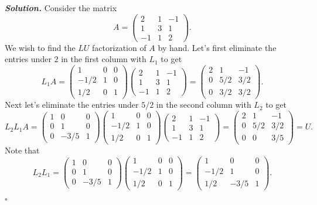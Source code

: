 \documentclass[12pt]{report}
\newenvironment{solution}[1][\it{Solution}]{\textbf{#1. } }{$\square$}
\begin{document}
\begin{solution}
    \noindent
    Consider the matrix
    \[
    A = \begin{pmatrix} 2 & 1 & -1 \\ 1 & 3 & 1 \\ -1 & 1 & 2 \end{pmatrix}.
    \]
    We wish to find the $LU$ factorization of $A$ by hand. Let's first eliminate the entries under $2$ in the first column with $L_1$ to get
    \[L_1A =  \begin{pmatrix}1&0&0\\-1/2&1&0\\1/2&0&1\end{pmatrix}\begin{pmatrix} 2 & 1 & -1 \\ 1 & 3 & 1 \\ -1 & 1 & 2 \end{pmatrix} = \begin{pmatrix}2&1&-1\\ 0&5/2&3/2\\ 0&3/2&3/2\end{pmatrix}.\]
    Next let's eliminate the entries under $5/2$ in the second column with $L_2$ to get
    \[L_2L_1A = \begin{pmatrix}1&0&0\\0&1&0\\0&-3/5&1\end{pmatrix}\begin{pmatrix}1&0&0\\-1/2&1&0\\1/2&0&1\end{pmatrix}\begin{pmatrix} 2 & 1 & -1 \\ 1 & 3 & 1 \\ -1 & 1 & 2 \end{pmatrix} = \begin{pmatrix}2&1&-1\\ 0&5/2&3/2\\ 0&0&3/5\end{pmatrix} = U.\]
    Note that
    \[L_2L_1 = \begin{pmatrix}1&0&0\\0&1&0\\0&-3/5&1\end{pmatrix}\begin{pmatrix}1&0&0\\-1/2&1&0\\1/2&0&1\end{pmatrix} = \begin{pmatrix}1&0&0\\-1/2&1&0\\1/2&-3/5&1\end{pmatrix}.\]

\end{solution}
\end{document}
